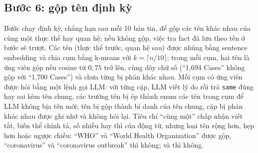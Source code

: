\subsection{Bước 6: gộp tên định kỳ}\label{sec:step-canon}

Bước  chạy định kỳ, chẳng hạn sau mỗi 10 bản tin, để gộp các tên khác nhau của cùng một thực thể hay quan hệ; nếu không gộp, việc tra fact đã lưu theo tên ở bước  sẽ trượt.
Các tên (thực thể trước, quan hệ sau) được nhúng bằng sentence embedding và chia cụm bằng k-means với $k=\lceil n/10\rceil$; trong mỗi cụm, hai tên là ứng viên gộp nếu cosine từ $0{,}75$ trở lên, cùng dãy chữ số (``1,694 Cases'' không gộp với ``1,700 Cases'') và chưa từng bị phán khác nhau.
Mỗi cụm có ứng viên được hỏi bằng một lệnh gọi LLM: với từng cặp, LLM viết lý do rồi trả \texttt{same} đúng hay sai kèm tên chung, các trường tên bị ép thành enum các tên trong cụm để LLM không bịa tên mới; tên bị gộp thành bí danh của tên chung, cặp bị phán khác nhau được ghi nhớ và không hỏi lại.
Tiêu chí ``cùng một'' chấp nhận viết tắt, biến thể chính tả, số nhiều hay thì của động từ, nhưng loại tên rộng hơn, hẹp hơn hoặc ngược chiều: ``WHO'' và ``World Health Organization'' được gộp, ``coronavirus'' và ``coronavirus outbreak'' thì không;  và  thì không.
